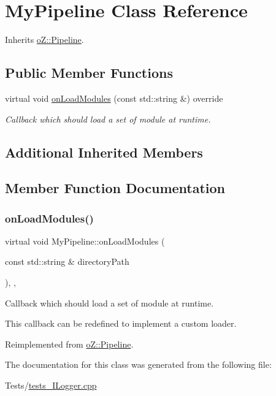 \hypertarget{class_my_pipeline}{}\section{My\+Pipeline Class Reference}
\label{class_my_pipeline}


Inherits \mbox{\hyperlink{classo_z_1_1_pipeline}{o\+Z\+::\+Pipeline}}.

\subsection*{Public Member Functions}
\begin{DoxyCompactItemize}
\item 
virtual void \mbox{\hyperlink{class_my_pipeline_ad6606d59165345cc508ae896d8cd10e8}{on\+Load\+Modules}} (const std\+::string \&) override
\begin{DoxyCompactList}\small\item\em Callback which should load a set of module at runtime. \end{DoxyCompactList}\end{DoxyCompactItemize}
\subsection*{Additional Inherited Members}


\subsection{Member Function Documentation}
\mbox{\label{class_my_pipeline_ad6606d59165345cc508ae896d8cd10e8}} 
\subsubsection{\texorpdfstring{onLoadModules()}{onLoadModules()}}
{\footnotesize\ttfamily virtual void My\+Pipeline\+::on\+Load\+Modules (\begin{DoxyParamCaption}\item[{const std\+::string \&}]{directory\+Path }\end{DoxyParamCaption})\hspace{0.3cm}{\ttfamily [inline]}, {\ttfamily [override]}, {\ttfamily [virtual]}}



Callback which should load a set of module at runtime. 

This callback can be redefined to implement a custom loader. 

Reimplemented from \mbox{\hyperlink{classo_z_1_1_pipeline_a0265d90a5540e69b25069d5d96973c53}{o\+Z\+::\+Pipeline}}.



The documentation for this class was generated from the following file\+:\begin{DoxyCompactItemize}
\item 
Tests/\mbox{\hyperlink{tests___i_logger_8cpp}{tests\+\_\+\+I\+Logger.\+cpp}}\end{DoxyCompactItemize}

